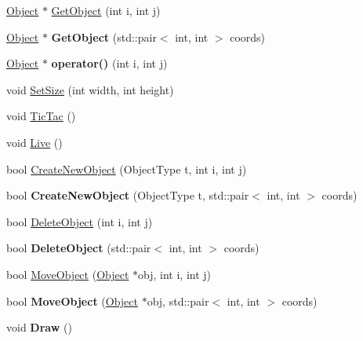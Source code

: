 \begin{DoxyCompactItemize}
\item 
\hyperlink{classObject}{Object} $\ast$ \hyperlink{classOcean_abe1c2639f431f057509ba765682fb8cc}{GetObject} (int i, int j)
\item 
\hypertarget{classOcean_a814b481b91d9713058d481218ffb1354}{
\hyperlink{classObject}{Object} $\ast$ {\bfseries GetObject} (std::pair$<$ int, int $>$ coords)}
\label{classOcean_a814b481b91d9713058d481218ffb1354}

\item 
\hypertarget{classOcean_adfd57c71b3f5b1641cbc2c75765f9e38}{
\hyperlink{classObject}{Object} $\ast$ {\bfseries operator()} (int i, int j)}
\label{classOcean_adfd57c71b3f5b1641cbc2c75765f9e38}

\item 
void \hyperlink{classOcean_af99ba918325e6190c0185d01d53d4efb}{SetSize} (int width, int height)
\item 
void \hyperlink{classOcean_a407104f71338029cd64258afc107187a}{TicTac} ()
\item 
void \hyperlink{classOcean_ac4ebb157e229dd87113c376366f99888}{Live} ()
\item 
bool \hyperlink{classOcean_a66c18f1745faa96683ba9d42bcdec9bb}{CreateNewObject} (ObjectType t, int i, int j)
\item 
\hypertarget{classOcean_a2926e26c57d9f650c89298eadf63ccc6}{
bool {\bfseries CreateNewObject} (ObjectType t, std::pair$<$ int, int $>$ coords)}
\label{classOcean_a2926e26c57d9f650c89298eadf63ccc6}

\item 
bool \hyperlink{classOcean_a15165a09cbd8a6075d622902f562bc15}{DeleteObject} (int i, int j)
\item 
\hypertarget{classOcean_a0fbddaf476741ba579cdfbe4dde0a930}{
bool {\bfseries DeleteObject} (std::pair$<$ int, int $>$ coords)}
\label{classOcean_a0fbddaf476741ba579cdfbe4dde0a930}

\item 
bool \hyperlink{classOcean_a7b9cb70ece3c3275003ea49bdba2c2e2}{MoveObject} (\hyperlink{classObject}{Object} $\ast$obj, int i, int j)
\item 
\hypertarget{classOcean_adeab83a1c9b5baf97e963f65847b277b}{
bool {\bfseries MoveObject} (\hyperlink{classObject}{Object} $\ast$obj, std::pair$<$ int, int $>$ coords)}
\label{classOcean_adeab83a1c9b5baf97e963f65847b277b}

\item 
\hypertarget{classOcean_aae9106a2b296255a476b6dbad3ec9399}{
void {\bfseries Draw} ()}
\label{classOcean_aae9106a2b296255a476b6dbad3ec9399}

\end{DoxyCompactItemize}
